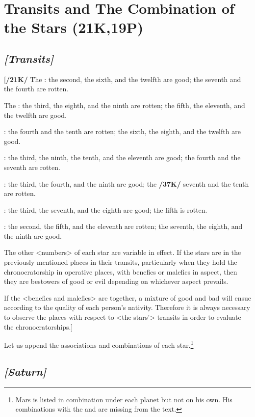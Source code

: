 \section{Transits and The Combination of the Stars (21K,19P)}

\subsection{\textit{[Transits]}}
[\textbf{/21K/}
The \Sun: the second, the sixth, and the twelfth are good; the seventh and the fourth are rotten.

The \Moon: the third, the eighth, and the ninth are rotten; the fifth, the eleventh, and the twelfth are good.

\Saturn: the fourth and the tenth are rotten; the sixth, the eighth, and the twelfth are good.

\Jupiter: the third, the ninth, the tenth, and the eleventh are good; the fourth and the seventh are rotten.

\Mars: the third, the fourth, and the ninth are good; the \textbf{/37K/} seventh and the tenth are rotten.

\Venus: the third, the seventh, and the eighth are good; the fifth is rotten.

\Mercury: the second, the fifth, and the eleventh are rotten; the seventh, the eighth, and the ninth are good.

\mndl[0.2cm]
The other <numbers> of each star are variable in effect.
If the stars are in the previously mentioned places in their transits, particularly when they hold the chronocratorship in operative places, with benefics or malefics in aspect, then they are bestowers of good or evil depending on whichever aspect prevails. 

\mnm[0.3cm]
If the <benefics and malefics> are together, a mixture of good and bad will ensue according to the quality of each person’s nativity. Therefore it is always necessary to
observe the places with respect to <the stars’> transits in order to evaluate the chronocratorships.]

Let us append the associations and combinations of each star.\enlargethispage{2\baselineskip}\footnote{Mars is listed in combination under each planet but not on his own. His combinations with the \Sun\xspace and \Moon\xspace are missing from the text.}



\secbr
\subsection{\textit{[Saturn]}}

